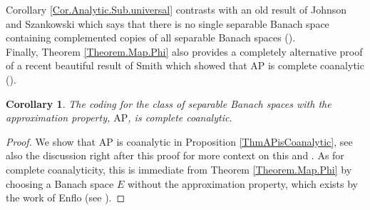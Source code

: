\documentclass[letterpaper]{amsart}
\numberwithin{equation}{section}
\newtheorem{corollary}[theorem]{Corollary}
\theoremstyle{definition}
\newcommand{\AP}{\mathrm{AP}}
\begin{document}
Corollary \ref{Cor.Analytic.Sub.universal} contrasts with an old result of Johnson and Szankowski which says that there is no single separable Banach space containing complemented copies of all separable Banach spaces (\cite[Theorem A]{JohnsonSzankowski1976Studia}).\\

Finally, Theorem \ref{Theorem.Map.Phi} also provides a completely alternative proof of a recent beautiful result of Smith which showed that   $\AP$ is complete coanalytic  (\cite[Theorem 4.1]{smith2026Studia}).

\begin{corollary}\label{Cor.Smith}
    The coding for the class of separable Banach spaces with the approximation property, $\AP$,
    is complete coanalytic.
\end{corollary}

\begin{proof}
We show that $\AP$ is coanalytic in Proposition \ref{ThmAPisCoanalytic}, see also the discussion right after this proof for more context on this and \cite{smith2026Studia}. As for complete coanalyticity, this is immediate from Theorem \ref{Theorem.Map.Phi} by choosing a Banach space $E$ without the approximation property, which exists by the work of Enflo (see \cite[Theorem 1]{Enflo1973Acta}).   
\end{proof}
\end{document}
